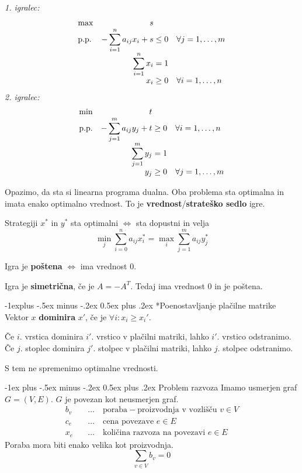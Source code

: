 \documentclass[a4paper,8pt]{extarticle}
\makeatletter
\renewcommand{\section}{\@startsection{section}{1}{0mm}%
                                {-1ex plus -.5ex minus -.2ex}%
                                {0.5ex plus .2ex}%
                                {\normalfont\large\bfseries}}
\renewcommand{\subsection}{\@startsection{subsection}{2}{0mm}%
                                {-1explus -.5ex minus -.2ex}%
                                {0.5ex plus .2ex}%
                                {\normalfont\normalsize\bfseries}}
\makeatother
\begin{document}
\begin{multicols}{4}
\emph{1. igralec:}
\begin{align*}
	\begin{array}{l >{\displaystyle}r@{\;} l l}
		\max 		& s	\\		
		\text{p.p.} & -\sum_{i=1}^n a_{ij} x_i + s 	&\leq 0	& \forall j=1,\dots , m\\
		& \sum_{i=1}^n x_i  			&= 1	& \\
		& x_i 	 						&\geq 0	&\forall i=1,\dots , n
	\end{array}
\end{align*}
\emph{2. igralec:}
\begin{align*}
	\begin{array}{l >{\displaystyle}r@{\;} l l}
		\min 		& t	\\		
		\text{p.p.} & -\sum_{j=1}^m a_{ij} y_j + t 	&\geq 0	& \forall i=1,\dots , n\\
					& \sum_{j=1}^m y_j  			&= 1	& \\
					& y_j 	 						&\geq 0	&\forall j=1,\dots , m
	\end{array}
\end{align*}

Opazimo, da sta si linearna programa dualna.
Oba problema sta optimalna in imata enako optimalno vrednost. To je \textbf{vrednost}/\textbf{strateško sedlo} igre.

Strategiji $x^*$ in $y^*$ sta optimalni $\iff$ sta dopustni in velja
\[ \min_j \sum_{i=0}^n a_{ij} x_i^* = \max_i \sum_{j=1}^m a_{ij} y_j^*\]

Igra je \textbf{poštena} $\iff$ ima vrednost 0.

Igra je \textbf{simetrična}, če je $A = -A^T$. Tedaj ima vrednost 0 in je poštena.

\subsection*{Poenostavljanje plačilne matrike}
Vektor $x$ \textbf{dominira} $x'$, če je $\forall i : x_i \geq x_i'$.

Če $i$. vrstica dominira $i'$. vrstico v plačilni matriki, lahko $i'$. vrstico odstranimo.\\
Če $j$. stoplec dominira $j'$. stolpec v plačilni matriki, lahko $j$. stolpec odstranimo.

S tem ne spremenimo optimalne vrednosti.

\section{Problem razvoza}
Imamo usmerjen graf $G = (V,E)$. $G$ je povezan kot neusmerjen graf.
\begin{align*}
	b_v \quad &\dots \quad \text{poraba$-$proizvodnja v vozlišču $v \in V$}\\
	c_e \quad &\dots \quad \text{cena povezave $e \in E$} \\
	x_e \quad &\dots \quad \text{količina razvoza na povezavi $e \in E$}
\end{align*}
Poraba mora biti enako velika kot proizvodnja.
\[ \sum_{v\in V} b_v = 0\]


\end{multicols}
\end{document}
